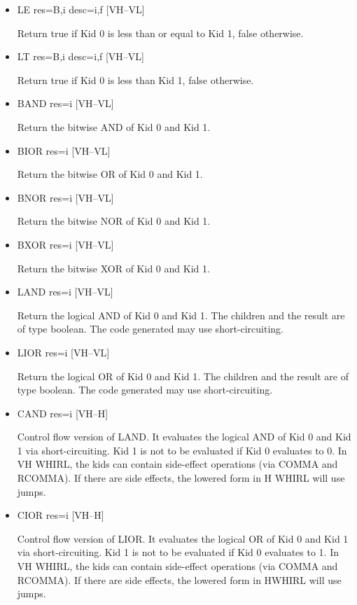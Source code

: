 \documentclass{article}
\begin{document}
\begin{itemize}
\item  LE res=B,i desc=i,f \hfill [VH--VL]

Return true if Kid 0 is less than or equal to Kid 1, false otherwise.

\item  LT res=B,i desc=i,f \hfill [VH--VL]

Return true if Kid 0 is less than Kid 1, false otherwise.

\item  BAND res=i \hfill [VH--VL]

Return the bitwise AND of Kid 0 and Kid 1.

\item  BIOR res=i \hfill [VH--VL]

Return the bitwise OR of Kid 0 and Kid 1.

\item  BNOR res=i \hfill [VH--VL]

Return the bitwise NOR of Kid 0 and Kid 1.

\item  BXOR res=i \hfill [VH--VL]

Return the bitwise XOR of Kid 0 and Kid 1.

\item  LAND res=i \hfill [VH--VL]

Return the logical AND of Kid 0 and Kid 1. The children and the
result are of type boolean. The code generated may use short-circuiting.

\item  LIOR res=i \hfill [VH--VL]

Return the logical OR of Kid 0 and Kid 1. The children and the
result are of type boolean. The code generated may use short-circuiting.

\item  CAND res=i \hfill [VH--H]

Control flow version of LAND. It evaluates the logical AND of Kid
0 and Kid 1 via short-circuiting. Kid 1 is not to be evaluated if
Kid 0 evaluates to 0. In VH WHIRL, the kids can contain side-effect operations
(via COMMA and RCOMMA). If there are side effects, the lowered form
in H WHIRL will use jumps.

\item  CIOR res=i \hfill [VH--H]

Control flow version of LIOR. It evaluates the logical OR of Kid
0 and Kid 1 via short-circuiting. Kid 1 is not to be evaluated if
Kid 0 evaluates to
1. In VH WHIRL, the kids can contain side-effect operations (via
COMMA and RCOMMA). If there are side effects, the lowered form in
HWHIRL will use jumps.


\end{itemize}
\end{document}

